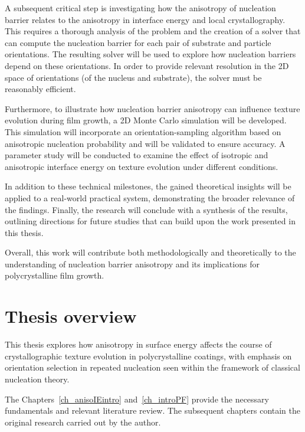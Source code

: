 A subsequent critical step is investigating how the anisotropy of nucleation barrier relates to the anisotropy in interface energy and local crystallography. This requires a thorough analysis of the problem and the creation of a solver that can compute the nucleation barrier for each pair of substrate and particle orientations. The resulting solver will be used to explore how nucleation barriers depend on these orientations. In order to provide relevant resolution in the 2D space of orientations (of the nucleus and substrate), the solver must be reasonably efficient.

Furthermore, to illustrate how nucleation barrier anisotropy can influence texture evolution during film growth, a 2D Monte Carlo simulation will be developed. This simulation will incorporate an orientation-sampling algorithm based on anisotropic nucleation probability and will be validated to ensure accuracy. A parameter study will be conducted to examine the effect of isotropic and anisotropic interface energy on texture evolution under different conditions.

In addition to these technical milestones, the gained theoretical insights will be applied to a real-world practical system, demonstrating the broader relevance of the findings. Finally, the research will conclude with a synthesis of the results, outlining directions for future studies that can build upon the work presented in this thesis.

Overall, this work will contribute both methodologically and theoretically to the understanding of nucleation barrier anisotropy and its implications for polycrystalline film growth. 


\section{Thesis overview} \label{sec_Thesis_overview}
This thesis explores how anisotropy in surface energy affects the course of crystallographic texture evolution in polycrystalline coatings, with emphasis on orientation selection in repeated nucleation seen within the framework of classical nucleation theory. 


The Chapters~\ref{ch_anisoIEintro} and~\ref{ch_introPF} provide the necessary fundamentals and relevant literature review. The subsequent chapters contain the original research carried out by the author.

